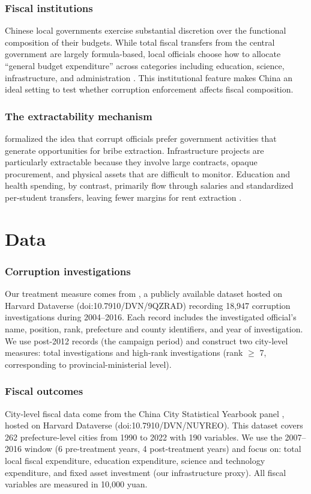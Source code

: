\documentclass[12pt]{article}
\begin{document}
\subsubsection*{Fiscal institutions} Chinese local governments exercise substantial discretion over the functional composition of their budgets. While total fiscal transfers from the central government are largely formula-based, local officials choose how to allocate ``general budget expenditure'' across categories including education, science, infrastructure, and administration \citep{chen2019, fan2009}. This institutional feature makes China an ideal setting to test whether corruption enforcement affects fiscal composition.

\subsubsection*{The extractability mechanism} \citet{shleifer1993} formalized the idea that corrupt officials prefer government activities that generate opportunities for bribe extraction. Infrastructure projects are particularly extractable because they involve large contracts, opaque procurement, and physical assets that are difficult to monitor. Education and health spending, by contrast, primarily flow through salaries and standardized per-student transfers, leaving fewer margins for rent extraction \citep{mauro1998, delavallade2006}.


\section{Data}

\subsubsection*{Corruption investigations} Our treatment measure comes from \citet{wang2020data}, a publicly available dataset hosted on Harvard Dataverse (doi:10.7910/DVN/9QZRAD) recording 18,947 corruption investigations during 2004--2016. Each record includes the investigated official's name, position, rank, prefecture and county identifiers, and year of investigation. We use post-2012 records (the campaign period) and construct two city-level measures: total investigations and high-rank investigations (rank $\geq$ 7, corresponding to provincial-ministerial level).

\subsubsection*{Fiscal outcomes} City-level fiscal data come from the China City Statistical Yearbook panel \citep{cityyearbook}, hosted on Harvard Dataverse (doi:10.7910/DVN/NUYREO). This dataset covers 262 prefecture-level cities from 1990 to 2022 with 190 variables. We use the 2007--2016 window (6 pre-treatment years, 4 post-treatment years) and focus on: total local fiscal expenditure, education expenditure, science and technology expenditure, and fixed asset investment (our infrastructure proxy). All fiscal variables are measured in 10,000 yuan.
\end{document}
